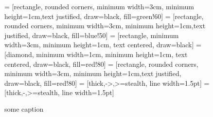 \documentclass{article}
\begin{document}
\begin{figure}
\begin{center}
 = [rectangle, rounded corners, minimum width=3cm, minimum height=1cm,text justified, draw=black, fill=green!60]
 = [rectangle, rounded corners, minimum width=3cm, minimum height=1cm,text justified, draw=black, fill=blue!50]
 = [rectangle, minimum width=3cm, minimum height=1cm, text centered, draw=black]
 = [diamond, minimum width=1cm, minimum height=1cm, text centered, draw=black, fill=red!80]
 = [rectangle, rounded corners, minimum width=3cm, minimum height=1cm,text justified, draw=black, fill=red!80]
 = [thick,->,>=stealth, line width=1.5pt]
 = [thick,-,>=stealth, line width=1.5pt]

\end{center}
\caption{some caption}
\end{figure}
\end{document}
